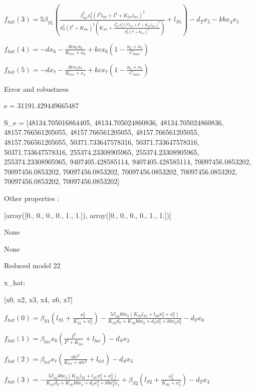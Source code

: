 $f_{hat}(3)=5 \beta_{S1} \left(\frac{\beta_{lac}^{2} x_{6}^{2} \left(I^{2} l_{lac} + I^{2} + K_{lac} l_{lac}\right)^{2}}{d_{S}^{2} \left(I^{2} + K_{lac}\right)^{2} \left(K_{S1} + \frac{\beta_{lac}^{2} x_{6}^{2} \left(I^{2} l_{lac} + I^{2} + K_{lac} l_{lac}\right)^{2}}{d_{S}^{2} \left(I^{2} + K_{lac}\right)^{2}}\right)} + l_{S1}\right) - d_{T} x_{5} - kb x_{4} x_{5}$


$f_{hat}(4)=- d x_{6} - \frac{dc x_{0} x_{6}}{K_{tox} + x_{0}} + kc x_{6} \left(1 - \frac{x_{6} + x_{7}}{C_{max}}\right)$


$f_{hat}(5)=- d x_{7} - \frac{dc x_{4} x_{7}}{K_{tox} + x_{4}} + kc x_{7} \left(1 - \frac{x_{6} + x_{7}}{C_{max}}\right)$



Error and robustness 


e = 31191.429449665487

S_e = [48134.705016864405, 48134.705024860836, 48134.705024860836, 48157.766561205055, 48157.766561205055, 48157.766561205055, 48157.766561205055, 50371.733647578316, 50371.733647578316, 50371.733647578316, 255374.23308905965, 255374.23308905965, 255374.23308905965, 9407405.428585114, 9407405.428585114, 70097456.0853202, 70097456.0853202, 70097456.0853202, 70097456.0853202, 70097456.0853202, 70097456.0853202, 70097456.0853202]

Other properties :


[array([0., 0., 0., 0., 1., 1.]), array([0., 0., 0., 0., 1., 1.])]

None

None

Reduced model 22

x_{hat}: 

[x0, x2, x3, x4, x6, x7]


$f_{hat}(0)=\beta_{S1} \left(l_{S1} + \frac{x_{2}^{2}}{K_{S1} + x_{2}^{2}}\right) - \frac{5 \beta_{S2} kb x_{0} \left(K_{S2} l_{S2} + l_{S2} x_{3}^{2} + x_{3}^{2}\right)}{K_{S2} d_{T} + K_{S2} kb x_{0} + d_{T} x_{3}^{2} + kb x_{0} x_{3}^{2}} - d_{T} x_{0}$


$f_{hat}(1)=\beta_{lac} x_{6} \left(\frac{I^{2}}{I^{2} + K_{lac}} + l_{lac}\right) - d_{S} x_{2}$


$f_{hat}(2)=\beta_{tet} x_{7} \left(\frac{atc^{2}}{K_{tet} + atc^{2}} + l_{tet}\right) - d_{S} x_{3}$


$f_{hat}(3)=- \frac{5 \beta_{S1} kb x_{4} \left(K_{S1} l_{S1} + l_{S1} x_{2}^{2} + x_{2}^{2}\right)}{K_{S1} d_{T} + K_{S1} kb x_{4} + d_{T} x_{2}^{2} + kb x_{2}^{2} x_{4}} + \beta_{S2} \left(l_{S2} + \frac{x_{3}^{2}}{K_{S2} + x_{3}^{2}}\right) - d_{T} x_{4}$


